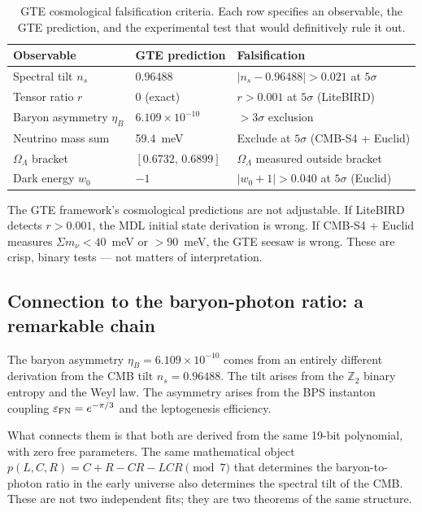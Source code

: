 \documentclass[11pt,a4paper]{article}
\newcommand{\ns}{n_s}
\newcommand{\OmL}{\Omega_\Lambda}
\newcommand{\etaB}{\eta_B}
\begin{document}
\begin{table}[h]
\centering
\caption{GTE cosmological falsification criteria. Each row specifies an
observable, the GTE prediction, and the experimental test that would
definitively rule it out.}
\label{tab:falsify}
\small
\begin{tabular}{lll}
\toprule
\textbf{Observable} & \textbf{GTE prediction} & \textbf{Falsification} \\
\midrule
Spectral tilt $\ns$ & $0.96488$ & $|\ns - 0.96488| > 0.021$ at $5\sigma$ \\
Tensor ratio $r$ & $0$ (exact) & $r > 0.001$ at $5\sigma$ (LiteBIRD) \\
Baryon asymmetry $\etaB$ & $6.109 \times 10^{-10}$ & $>3\sigma$ exclusion \\
Neutrino mass sum & 59.4~meV & Exclude at $5\sigma$ (CMB-S4 + Euclid) \\
$\OmL$ bracket & $[0.6732,\,0.6899]$ & $\OmL$ measured outside bracket \\
Dark energy $w_0$ & $-1$ & $|w_0 + 1| > 0.040$ at $5\sigma$ (Euclid) \\
\bottomrule
\end{tabular}
\end{table}

The GTE framework's cosmological predictions are not adjustable.
If LiteBIRD detects $r > 0.001$, the MDL initial state derivation is wrong.
If CMB-S4 + Euclid measures $\Sigma m_\nu < 40$~meV or $> 90$~meV, the GTE
seesaw is wrong.
These are crisp, binary tests --- not matters of interpretation.

\subsection{Connection to the baryon-photon ratio: a remarkable chain}

The baryon asymmetry $\etaB = 6.109 \times 10^{-10}$ comes from an
entirely different derivation from the CMB tilt $\ns = 0.96488$.
The tilt arises from the $\mathbb{Z}_2$ binary entropy and the Weyl law.
The asymmetry arises from the BPS instanton coupling $\varepsilon_{\rm FN} = e^{-\pi/3}$
and the leptogenesis efficiency.

What connects them is that both are derived from the same 19-bit polynomial,
with zero free parameters.
The same mathematical object
$p(L,C,R) = C + R - CR - LCR \pmod{7}$
that determines the baryon-to-photon ratio in the early universe also determines
the spectral tilt of the CMB.
These are not two independent fits; they are two theorems of the same structure.
\end{document}

